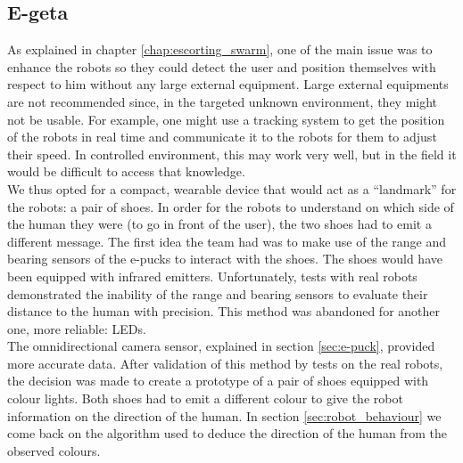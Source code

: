 \documentclass[oneside, a4paper, 12pt]{memoir}
\begin{document}
		\subsection{E-geta} %

		
	As explained in chapter \ref{chap:escorting_swarm}, one of the main issue was to enhance the robots so they could detect the user and position themselves with respect to him without any large external equipment. Large external equipments are not recommended since, in the targeted unknown environment, they might not be usable. For example, one might use a tracking system to get the position of the robots in real time and communicate it to the robots for them to adjust their speed. In controlled environment, this may work very well, but in the field it would be difficult to access that knowledge.\\
	
	We thus opted for a compact, wearable device that would act as a \enquote{landmark} for the robots: a pair of shoes. In order for the robots to understand on which side of the human they were (to go in front of the user), the two shoes had to emit a different message. The first idea the team had was to make use of the range and bearing sensors of the e-pucks to interact with the shoes. The shoes would have been equipped with infrared emitters. Unfortunately, tests with real robots demonstrated the inability of the range and bearing sensors to evaluate their distance to the human with precision. This method was abandoned for another one, more reliable: LEDs.\\
	
	The omnidirectional camera sensor, explained in section \ref{sec:e-puck}, provided more accurate data. After validation of this method by tests on the real robots, the decision was made to create a prototype of a pair of shoes equipped with colour lights. Both shoes had to emit a different colour to give the robot information on the direction of the human. In section \ref{sec:robot_behaviour} we come back on the algorithm used to deduce the direction of the human from the observed colours.\\
	
\end{document}
